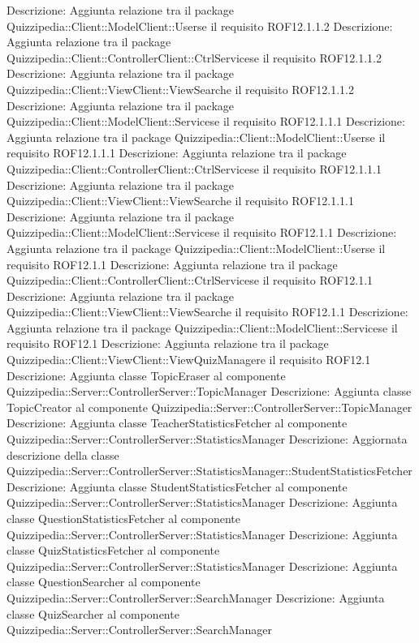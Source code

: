 Descrizione: Aggiunta relazione tra il package Quizzipedia::Client::ModelClient::Userse il requisito ROF12.1.1.2 
Descrizione: Aggiunta relazione tra il package Quizzipedia::Client::ControllerClient::CtrlServicese il requisito ROF12.1.1.2 
Descrizione: Aggiunta relazione tra il package Quizzipedia::Client::ViewClient::ViewSearche il requisito ROF12.1.1.2 
Descrizione: Aggiunta relazione tra il package Quizzipedia::Client::ModelClient::Servicese il requisito ROF12.1.1.1 
Descrizione: Aggiunta relazione tra il package Quizzipedia::Client::ModelClient::Userse il requisito ROF12.1.1.1 
Descrizione: Aggiunta relazione tra il package Quizzipedia::Client::ControllerClient::CtrlServicese il requisito ROF12.1.1.1 
Descrizione: Aggiunta relazione tra il package Quizzipedia::Client::ViewClient::ViewSearche il requisito ROF12.1.1.1 
Descrizione: Aggiunta relazione tra il package Quizzipedia::Client::ModelClient::Servicese il requisito ROF12.1.1 
Descrizione: Aggiunta relazione tra il package Quizzipedia::Client::ModelClient::Userse il requisito ROF12.1.1 
Descrizione: Aggiunta relazione tra il package Quizzipedia::Client::ControllerClient::CtrlServicese il requisito ROF12.1.1 
Descrizione: Aggiunta relazione tra il package Quizzipedia::Client::ViewClient::ViewSearche il requisito ROF12.1.1 
Descrizione: Aggiunta relazione tra il package Quizzipedia::Client::ModelClient::Servicese il requisito ROF12.1 
Descrizione: Aggiunta relazione tra il package Quizzipedia::Client::ViewClient::ViewQuizManagere il requisito ROF12.1 
Descrizione: Aggiunta classe TopicEraser al componente Quizzipedia::Server::ControllerServer::TopicManager 
Descrizione: Aggiunta classe TopicCreator al componente Quizzipedia::Server::ControllerServer::TopicManager 
Descrizione: Aggiunta classe TeacherStatisticsFetcher al componente Quizzipedia::Server::ControllerServer::StatisticsManager 
Descrizione: Aggiornata descrizione della classe Quizzipedia::Server::ControllerServer::StatisticsManager::StudentStatisticsFetcher 
Descrizione: Aggiunta classe StudentStatisticsFetcher al componente Quizzipedia::Server::ControllerServer::StatisticsManager 
Descrizione: Aggiunta classe QuestionStatisticsFetcher al componente Quizzipedia::Server::ControllerServer::StatisticsManager 
Descrizione: Aggiunta classe QuizStatisticsFetcher al componente Quizzipedia::Server::ControllerServer::StatisticsManager 
Descrizione: Aggiunta classe QuestionSearcher al componente Quizzipedia::Server::ControllerServer::SearchManager 
Descrizione: Aggiunta classe QuizSearcher al componente Quizzipedia::Server::ControllerServer::SearchManager 
